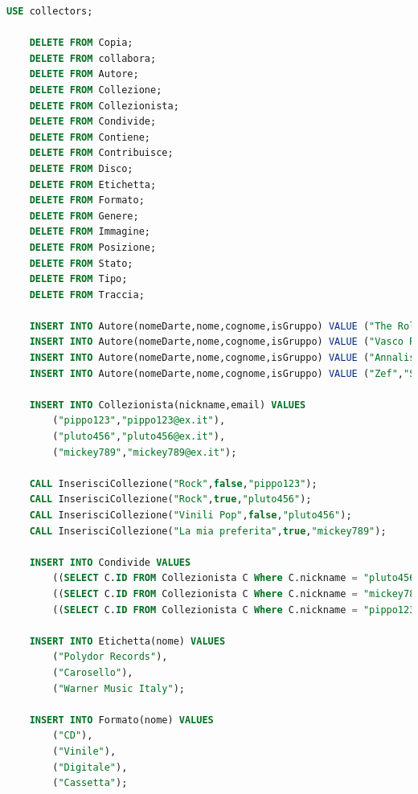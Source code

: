 \documentclass{article}
\begin{document}
\begin{lstlisting}[language=SQL]
    USE collectors;
    
    DELETE FROM Copia;
    DELETE FROM collabora;
    DELETE FROM Autore;
    DELETE FROM Collezione;
    DELETE FROM Collezionista;
    DELETE FROM Condivide;
    DELETE FROM Contiene;
    DELETE FROM Contribuisce;
    DELETE FROM Disco;
    DELETE FROM Etichetta;
    DELETE FROM Formato;
    DELETE FROM Genere;
    DELETE FROM Immagine;
    DELETE FROM Posizione;
    DELETE FROM Stato;
    DELETE FROM Tipo;
    DELETE FROM Traccia;

    INSERT INTO Autore(nomeDarte,nome,cognome,isGruppo) VALUE ("The Rolling Stones",null,null,true);
    INSERT INTO Autore(nomeDarte,nome,cognome,isGruppo) VALUE ("Vasco Rossi","Vasco","Rossi",false);
    INSERT INTO Autore(nomeDarte,nome,cognome,isGruppo) VALUE ("Annalisa","Annalisa","Scarrone",false);
    INSERT INTO Autore(nomeDarte,nome,cognome,isGruppo) VALUE ("Zef","Stefano","Tognini",false);
        
    INSERT INTO Collezionista(nickname,email) VALUES 
        ("pippo123","pippo123@ex.it"),
        ("pluto456","pluto456@ex.it"),
        ("mickey789","mickey789@ex.it");

    CALL InserisciCollezione("Rock",false,"pippo123");
    CALL InserisciCollezione("Rock",true,"pluto456");
    CALL InserisciCollezione("Vinili Pop",false,"pluto456");
    CALL InserisciCollezione("La mia preferita",true,"mickey789");

    INSERT INTO Condivide VALUES 
        ((SELECT C.ID FROM Collezionista C Where C.nickname = "pluto456"),(SELECT C.ID FROM Collezione C Where C.nome = "Rock" AND C.id_collezionista = ((SELECT C.ID FROM Collezionista C Where C.nickname = "pippo123")))),
        ((SELECT C.ID FROM Collezionista C Where C.nickname = "mickey789"),(SELECT C.ID FROM Collezione C Where C.nome = "Rock" AND C.id_collezionista = ((SELECT C.ID FROM Collezionista C Where C.nickname = "pippo123")))),
        ((SELECT C.ID FROM Collezionista C Where C.nickname = "pippo123"),(SELECT C.ID FROM Collezione C Where C.nome = "Vinili Pop" AND C.id_collezionista = ((SELECT C.ID FROM Collezionista C Where C.nickname = "pluto456"))));

    INSERT INTO Etichetta(nome) VALUES 
        ("Polydor Records"),
        ("Carosello"),
        ("Warner Music Italy");

    INSERT INTO Formato(nome) VALUES 
        ("CD"),
        ("Vinile"),
        ("Digitale"),
        ("Cassetta");


\end{lstlisting}
\end{document}
